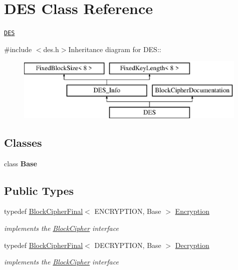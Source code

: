 \hypertarget{class_d_e_s}{
\section{DES Class Reference}
\label{class_d_e_s}
}


\href{http://www.weidai.com/scan-mirror/cs.html#DES}{\tt DES}  


{\ttfamily \#include $<$des.h$>$}Inheritance diagram for DES::\begin{figure}[H]
\begin{center}
\leavevmode
\includegraphics[height=3cm]{class_d_e_s}
\end{center}
\end{figure}
\subsection*{Classes}
\begin{DoxyCompactItemize}
\item 
class {\bfseries Base}
\end{DoxyCompactItemize}
\subsection*{Public Types}
\begin{DoxyCompactItemize}
\item 
\hypertarget{class_d_e_s_acf2cdef8c9a64ca67a44117658890aa5}{
typedef \hyperlink{class_block_cipher_final}{BlockCipherFinal}$<$ ENCRYPTION, Base $>$ \hyperlink{class_d_e_s_acf2cdef8c9a64ca67a44117658890aa5}{Encryption}}
\label{class_d_e_s_acf2cdef8c9a64ca67a44117658890aa5}

\begin{DoxyCompactList}\small\item\em implements the \hyperlink{class_block_cipher}{BlockCipher} interface \item\end{DoxyCompactList}\item 
\hypertarget{class_d_e_s_a546cc867f9dfab26d5a41a198f738503}{
typedef \hyperlink{class_block_cipher_final}{BlockCipherFinal}$<$ DECRYPTION, Base $>$ \hyperlink{class_d_e_s_a546cc867f9dfab26d5a41a198f738503}{Decryption}}
\label{class_d_e_s_a546cc867f9dfab26d5a41a198f738503}

\begin{DoxyCompactList}\small\item\em implements the \hyperlink{class_block_cipher}{BlockCipher} interface \item\end{DoxyCompactList}\end{DoxyCompactItemize}
